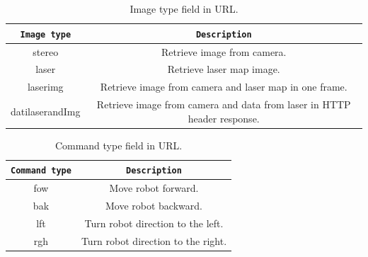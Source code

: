 \begin{table}[!h]
  \centering  
  \begin{tabular}{| c | c |}

    \hline
    \texttt{\bf Image type} &
    \texttt{\bf Description} \\ %

    \hline
    \parbox[t]{6.5cm}{\raggedright \small stereo } &
    \parbox[t]{6cm}{\raggedright \small
      Retrieve image from camera.} \\  [1ex]

    \hline
    \parbox[t]{6.5cm}{\raggedright \small laser } &
    \parbox[t]{6cm}{\raggedright \small
      Retrieve laser map image.} \\  [1ex]

    \hline
    \parbox[t]{6.5cm}{\raggedright \small  laserimg } &
    \parbox[t]{6cm}{\raggedright \small
      Retrieve image from camera and laser map in one frame.} \\  [1ex]

    \hline
    \parbox[t]{6.5cm}{\raggedright \small datilaserandImg } &
    \parbox[t]{6cm}{\raggedright \small
      Retrieve image from camera and data from laser in HTTP header response.} \\  [1ex]

    \hline

  \end{tabular}
  \caption{Image type field in URL.}
  \label{table:image_type}
\end{table}

\begin{table}[!h]
  \centering  
  \begin{tabular}{| c | c |}

    \hline
    \texttt{\bf Command type} &
    \texttt{\bf Description} \\ %

    \hline
    \parbox[t]{6.5cm}{\raggedright \small fow } &
    \parbox[t]{6cm}{\raggedright \small
      Move robot forward.} \\  [1ex]

    \hline
    \parbox[t]{6.5cm}{\raggedright \small bak } &
    \parbox[t]{6cm}{\raggedright \small
      Move robot backward.} \\  [1ex]

    \hline
    \parbox[t]{6.5cm}{\raggedright \small lft } &
    \parbox[t]{6cm}{\raggedright \small
      Turn robot direction to the left.} \\  [1ex]

    \hline
    \parbox[t]{6.5cm}{\raggedright \small rgh } &
    \parbox[t]{6cm}{\raggedright \small
      Turn robot direction to the right.} \\  [1ex]

    \hline

  \end{tabular}
  \caption{Command type field in URL.}
  \label{table:command_type}
\end{table}

